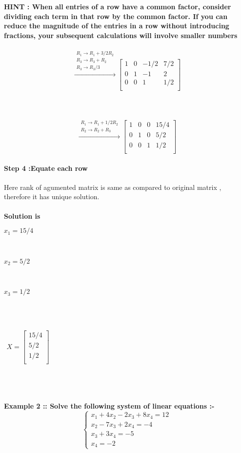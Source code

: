 \documentclass[15pt]{article}
\begin{document}
  \\
  \\
   \textbf{HINT : When all entries of a row have a common factor, consider dividing each term in that row by the common factor. If you can reduce the magnitude of the entries in a row without introducing fractions, your subsequent calculations will involve smaller numbers}
   \\
   \\
   \[
 \xrightarrow{\substack{R_1 \rightarrow R_1 + 3/2 R_2\\ R_3\rightarrow R_3 + R_2 \\ R_3 \rightarrow R_3/3}}
\left[\begin{array}{rrr|r}
  1 & 0 & -1/2 & 7/2 \\
  0 & 1 & -1 & 2 \\
  0 & 0 & 1 & 1/2 \\
  \end{array}\right]
  \]\\
  \\
  \\
  
 \[
 \xrightarrow{\substack{R_1 \rightarrow R_1 + 1/2 R_2\\ R_2\rightarrow R_2 + R_3}}
\left[\begin{array}{rrr|r}
  1 & 0 & 0 & 15/4 \\
  0 & 1 & 0 & 5/2 \\
  0 & 0 & 1 & 1/2 \\
  \end{array}\right]
  \]\\
\textbf{Step 4 :Equate each row  }\\
\\
\textrm{}{Here rank of agumented matrix is same as compared to original matrix , therefore it has unique solution.}
\\
\\
\textbf{Solution is }
\\
\centerline{$ x_1 = 15/4 $}\\
\centerline{$ x_2 = 5/2 $}\\
\centerline{$  x_3 = 1/2$}
\\
\\
\centerline{
$\begin{matrix}
X=
\begin{bmatrix}
15/4\\
5/2\\
1/2\\
\end{bmatrix}
\end{matrix}$}
\\
\\
\\
\textbf{Example 2 :: Solve the following system of linear equations :- }
\[
\left\{ 
\begin{array}{c}
x_1 + 4x_2-2x_3 + 8x_4=12 \\ 
x_2-7x_3+2x_4=-4 \\ 
x_3+3x_4=-5\\
x_4=-2
\end{array}
\right. 
\]\\
\\
\\
\end{document}
